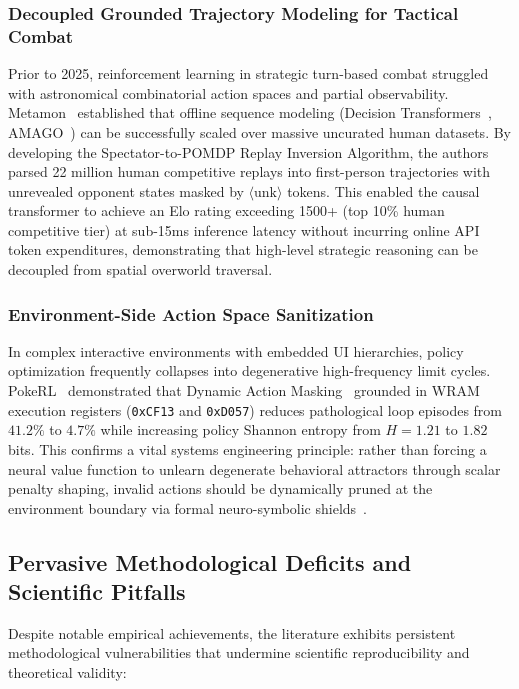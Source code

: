 \documentclass[journal,10pt,twocolumn]{IEEEtran}
\begin{document}
\subsubsection{Decoupled Grounded Trajectory Modeling for Tactical Combat}
Prior to 2025, reinforcement learning in strategic turn-based combat struggled with astronomical combinatorial action spaces and partial observability. Metamon~\cite{grigsby2025metamon} established that offline sequence modeling (Decision Transformers~\cite{chen2021decisiontransformer}, AMAGO~\cite{grigsby2024amago}) can be successfully scaled over massive uncurated human datasets. By developing the Spectator-to-POMDP Replay Inversion Algorithm, the authors parsed 22 million human competitive replays into first-person trajectories with unrevealed opponent states masked by $\langle\text{unk}\rangle$ tokens. This enabled the causal transformer to achieve an Elo rating exceeding 1500+ (top 10\% human competitive tier) at sub-15ms inference latency without incurring online API token expenditures, demonstrating that high-level strategic reasoning can be decoupled from spatial overworld traversal.

\subsubsection{Environment-Side Action Space Sanitization}
In complex interactive environments with embedded UI hierarchies, policy optimization frequently collapses into degenerative high-frequency limit cycles. PokeRL~\cite{mudireddy2026pokerl} demonstrated that Dynamic Action Masking~\cite{huang2022actionmasking} grounded in WRAM execution registers (\texttt{0xCF13} and \texttt{0xD057}) reduces pathological loop episodes from $41.2\%$ to $4.7\%$ while increasing policy Shannon entropy from $H=1.21$ to $1.82$ bits. This confirms a vital systems engineering principle: rather than forcing a neural value function to unlearn degenerate behavioral attractors through scalar penalty shaping, invalid actions should be dynamically pruned at the environment boundary via formal neuro-symbolic shields~\cite{alshiekh2018shielding,toroicarte2022rewardmachines}.

\subsection{Pervasive Methodological Deficits and Scientific Pitfalls}
Despite notable empirical achievements, the literature exhibits persistent methodological vulnerabilities that undermine scientific reproducibility and theoretical validity:
\end{document}
